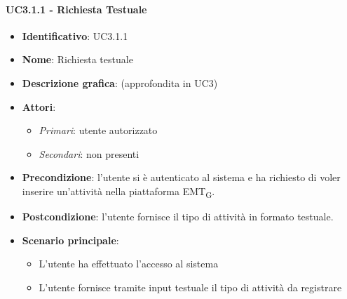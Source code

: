 \paragraph{UC3.1.1 - Richiesta Testuale}
\begin{itemize}
   \item \textbf{Identificativo}: UC3.1.1
   \item \textbf{Nome}: Richiesta testuale
   \item \textbf{Descrizione grafica}: (approfondita in UC3)
   \item \textbf{Attori}:
   \begin{itemize} 
       \item \textit{Primari}: utente autorizzato
       \item \textit{Secondari}: non presenti
   \end{itemize}
       \item \textbf{Precondizione}: l'utente si è autenticato al sistema e ha richiesto di voler inserire un'attività nella piattaforma EMT\textsubscript{G}. 
       \item \textbf{Postcondizione}: l'utente fornisce il tipo di attività in formato testuale. 
    \item \textbf{Scenario principale}: 
       \begin{itemize}
           \item L'utente ha effettuato l'accesso al sistema 
           \item L'utente fornisce tramite input testuale il tipo di attività da  registrare
       \end{itemize}
\end{itemize}


